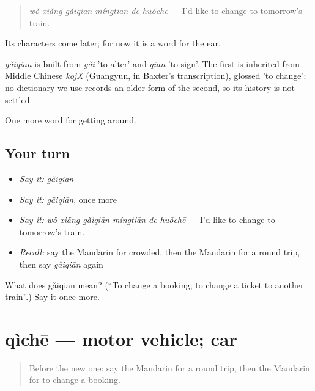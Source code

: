\begin{quote}
\emph{wǒ xiǎng gǎiqiān míngtiān de huǒchē} — I'd like to change to tomorrow's train.
\end{quote}

Its characters come later; for now it is a word for the ear.

\begin{cousinweb}
\emph{gǎiqiān} is built from \emph{gǎi} 'to alter' and \emph{qiān} 'to sign'. The first is inherited from Middle Chinese \emph{kojX} (Guangyun, in Baxter's transcription), glossed 'to change'; no dictionary we use records an older form of the second, so its history is not settled.
\end{cousinweb}

\begin{grammarlens}[title={What you've built}]
One more word for getting around.
\end{grammarlens}

\subsection*{Your turn}
\begin{itemize}
\raggedright
  \item \emph{Say it:} \emph{gǎiqiān}
  \item \emph{Say it:} \emph{gǎiqiān}, once more
  \item \emph{Say it:} \emph{wǒ xiǎng gǎiqiān míngtiān de huǒchē} — I'd like to change to tomorrow's train.
  \item \emph{Recall:} say the Mandarin for crowded, then the Mandarin for a round trip, then say \emph{gǎiqiān} again
\end{itemize}

\begin{tcolorbox}[breakable,colback=teal!4,colframe=teal!35!black,title={Before you move on}]
What does gǎiqiān mean? (\textquotedblleft{}To change a booking; to change a ticket to another train\textquotedblright{}.) Say it once more.
\end{tcolorbox}
\section[qìchē]{qìchē — motor vehicle; car}

\label{lesson:ZH-C406-qiche}



\begin{quote}
Before the new one: say the Mandarin for a round trip, then the Mandarin for to change a booking.
\end{quote}

